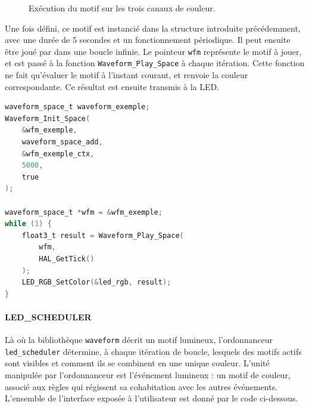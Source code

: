 \begin{figure}[h]
	\centering
	\caption{Exécution du motif sur les trois canaux de couleur.}
	\label{fig:waveform_exemple}
\end{figure}

\vfill\vfill

\newpage

Une fois défini, ce motif est instancié dans la structure introduite précédemment, avec une durée de 5 secondes et un
fonctionnement périodique. Il peut ensuite être joué par dans une boucle infinie. Le pointeur \texttt{wfm} représente le motif
à jouer, et est passé à la fonction \texttt{Waveform\_Play\_Space} à chaque itération. Cette fonction ne fait qu'évaluer le
motif à l'instant courant, et renvoie la couleur correspondante. Ce résultat est ensuite transmis à la LED.

\begin{lstlisting}[language=C, frame=tb, basicstyle=\small]
waveform_space_t waveform_exemple;
Waveform_Init_Space(
	&wfm_exemple,
	waveform_space_add,
	&wfm_exemple_ctx,
	5000,
	true
);

waveform_space_t *wfm = &wfm_exemple;
while (1) {
    float3_t result = Waveform_Play_Space(
		wfm,
		HAL_GetTick()
	);
    LED_RGB_SetColor(&led_rgb, result);
}
\end{lstlisting}

\newpage

\paragraph*{LED\_SCHEDULER} Là où la bibliothèque \texttt{waveform} décrit un motif lumineux, l'ordonnanceur
\texttt{led\_scheduler} détermine, à chaque itération de boucle, lesquels des motifs actifs sont visibles et comment ils se
combinent en une unique couleur. L'unité manipulée par l'ordonnanceur est l'événement lumineux : un motif de couleur, associé
aux règles qui régissent sa cohabitation avec les autres événements. L'ensemble de l'interface exposée à l'utilisateur est
donné par le code ci-dessous.


